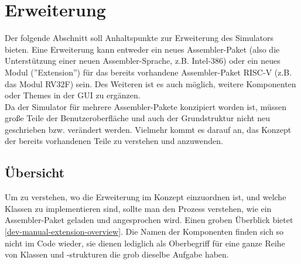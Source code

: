 
\section{Erweiterung}
\label{dev:extension}

Der folgende Abschnitt soll Anhaltspunkte zur Erweiterung des Simulators bieten.
Eine Erweiterung kann entweder ein neues Assembler-Paket (also die Unterstützung
einer neuen Assembler-Sprache, z.B. Intel-386) oder ein
neues Modul (''Extension'') für das bereits vorhandene Assembler-Paket RISC-V
(z.B. das Modul RV32F) sein. Des Weiteren ist es auch möglich, weitere
Komponenten oder Themes in der GUI zu ergänzen.\\

Da der Simulator für mehrere Assembler-Pakete konzipiert worden ist, müssen
große Teile der Benutzeroberfläche und auch der Grundstruktur nicht neu
geschrieben bzw. verändert werden. Vielmehr kommt es darauf an, das Konzept der
bereits vorhandenen Teile zu verstehen und anzuwenden.\\

\subsection{Übersicht}

Um zu verstehen, wo die Erweiterung im Konzept einzuordnen ist, und welche
Klassen zu implementieren sind, sollte man den Prozess verstehen, wie ein
Assembler-Paket geladen und angesprochen wird. Einen groben Überblick bietet \autoref{dev-manual-extension-overview}. Die Namen der Komponenten finden sich so nicht im Code
wieder, sie dienen lediglich als Oberbegriff für eine ganze Reihe von Klassen
und -strukturen die grob dieselbe Aufgabe haben.

